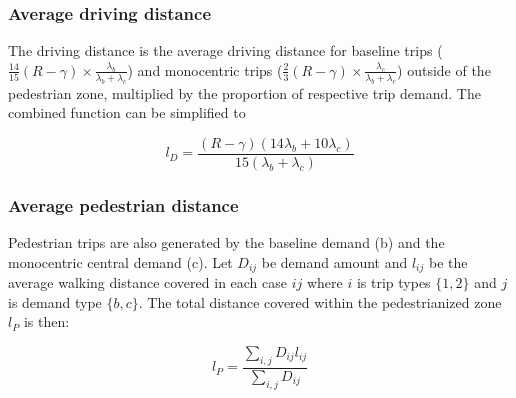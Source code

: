 \documentclass{elsarticle}\usepackage[]{graphicx}\usepackage[]{color}
\begin{document}
\subsubsection{Average driving distance}
The driving distance is the average driving distance for baseline trips ($\frac{14}{15}(R-\gamma)\times\frac{\lambda_b}{\lambda_b + \lambda_c}$) and monocentric trips ($\frac{2}{3}(R-\gamma)\times\frac{\lambda_c}{\lambda_b + \lambda_c}$) outside of the pedestrian zone, multiplied by the proportion of respective trip demand. The combined function can be simplified to

    \begin{equation}
    l_D = \frac{(R-\gamma)(14\lambda_b + 10\lambda_c)}{15(\lambda_b + \lambda_c)}
    \end{equation}

\subsubsection{Average pedestrian distance}
Pedestrian trips are also generated by the baseline demand (b) and the monocentric central demand (c). Let $D_{ij}$ be demand amount and $l_{ij}$ be the average walking distance covered in each case $ij$ where $i$ is trip types $\{1,2\}$ and $j$ is demand type $\{b,c\}$. The total distance covered within the pedestrianized zone $l_P$ is then:
    
    \begin{equation}
         l_P = \frac{\sum\limits_{i,j} D_{ij}l_{ij} }{\sum\limits_{i,j} D_{ij}}
    \end{equation}
    
\end{document}
